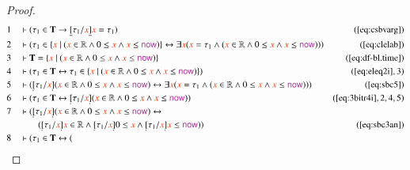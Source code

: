\begin{proof}
\begin{align}
  1 &&  & \vdash ( \tau_1 \in \mathbf{T} \rightarrow \underline{[} \tau_1 /
      \msc{x} \underline{]} \msc{x} = \tau_1
      )&(\mbox{\ref{eq:csbvarg}})\notag
  \\ 2 &&  & \vdash ( \tau_1 \in \{ \msc{x}~\vert~( \msc{x} \in \mathbb{R} \wedge 0
      \le \msc{x} \wedge \msc{x} \le \mathsf{\mc{now}} ) \}
      \leftrightarrow \exists \msc{x} ( \msc{x} = \tau_1
      \wedge ( \msc{x} \in \mathbb{R} \wedge 0 \le \msc{x}
      \wedge \msc{x} \le \mathsf{\mc{now}} ) )
      )&(\mbox{\ref{eq:clelab}})\notag
  \\ 3 &&  & \vdash \mathbf{T} = \{ \msc{x}~\vert~( \msc{x} \in \mathbb{R} \wedge 0
      \le \msc{x} \wedge \msc{x} \le \mathsf{\mc{now}} )
      \}&(\mbox{\ref{eq:df-bl.time}})\notag
  \\ 4 &&  & \vdash ( \tau_1 \in \mathbf{T} \leftrightarrow \tau_1 \in \{
      \msc{x}~\vert~( \msc{x} \in \mathbb{R} \wedge 0 \le
      \msc{x} \wedge \msc{x} \le \mathsf{\mc{now}} ) \}
      )&(\mbox{\ref{eq:eleq2i}},3)\notag
  \\ 5 &&  & \vdash ( \underaccent{\dot}{[} \tau_1 / \msc{x}
      \underaccent{\dot}{]} ( \msc{x} \in \mathbb{R} \wedge
      0 \le \msc{x} \wedge \msc{x} \le \mathsf{\mc{now}} )
      \leftrightarrow \exists \msc{x} ( \msc{x} = \tau_1
      \wedge ( \msc{x} \in \mathbb{R} \wedge 0 \le \msc{x}
      \wedge \msc{x} \le \mathsf{\mc{now}} ) )
      )&(\mbox{\ref{eq:sbc5}})\notag
  \\ 6 &&  & \vdash ( \tau_1 \in \mathbf{T} \leftrightarrow
      \underaccent{\dot}{[} \tau_1 / \msc{x}
      \underaccent{\dot}{]} ( \msc{x} \in \mathbb{R} \wedge
      0 \le \msc{x} \wedge \msc{x} \le \mathsf{\mc{now}} )
      )&(\mbox{\ref{eq:3bitr4i}},2,4,5)\notag
  \\ 7 &&  & \vdash ( \underaccent{\dot}{[} \tau_1 / \msc{x}
      \underaccent{\dot}{]} ( \msc{x} \in \mathbb{R} \wedge
      0 \le \msc{x} \wedge \msc{x} \le \mathsf{\mc{now}} )
      \leftrightarrow \notag \\ & & & \qquad
       ( \underaccent{\dot}{[} \tau_1 /
      \msc{x} \underaccent{\dot}{]} \msc{x} \in \mathbb{R}
      \wedge \underaccent{\dot}{[} \tau_1 / \msc{x}
      \underaccent{\dot}{]} 0 \le \msc{x} \wedge
      \underaccent{\dot}{[} \tau_1 / \msc{x}
      \underaccent{\dot}{]} \msc{x} \le \mathsf{\mc{now}} )
      )&(\mbox{\ref{eq:sbc3an}})\notag
  \\ 8 &&  & \vdash ( \tau_1 \in \mathbf{T} \leftrightarrow (

\end{align}
\end{proof}
